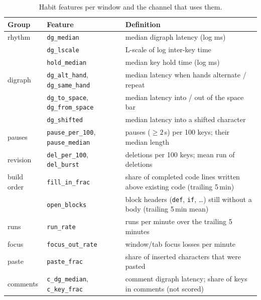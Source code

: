 \begin{table}[ht]
  \centering\small
  \caption{Habit features per window and the channel that uses them.}
  \label{tab:features}
  \begin{tabularx}{\linewidth}{@{}llX@{}}
    \toprule
    Group & Feature & Definition \\
    \midrule
    rhythm & \texttt{dg\_median} & median digraph latency (log ms) \\
     & \texttt{dg\_lscale} & L-scale of log inter-key time \\
     & \texttt{hold\_median} & median key hold time (log ms) \\
    digraph & \texttt{dg\_alt\_hand}, \texttt{dg\_same\_hand} & median latency when hands alternate / repeat \\
     & \texttt{dg\_to\_space}, \texttt{dg\_from\_space} & median latency into / out of the space bar \\
     & \texttt{dg\_shifted} & median latency into a shifted character \\
    \midrule
    pauses & \texttt{pause\_per\_100}, \texttt{pause\_median} & pauses ($\ge 2$\,s) per 100 keys; their median length \\
    revision & \texttt{del\_per\_100}, \texttt{del\_burst} & deletions per 100 keys; mean run of deletions \\
    build order & \texttt{fill\_in\_frac} & share of completed code lines written above existing code (trailing 5\,min) \\
     & \texttt{open\_blocks} & block headers (\texttt{def}, \texttt{if}, \ldots) still without a body (trailing 5\,min mean) \\
    runs & \texttt{run\_rate} & runs per minute over the trailing 5 minutes \\
    focus & \texttt{focus\_out\_rate} & window/tab focus losses per minute \\
    paste & \texttt{paste\_frac} & share of inserted characters that were pasted \\
    \midrule
    comments & \texttt{c\_dg\_median}, \texttt{c\_key\_frac} & comment digraph latency; share of keys in comments (not scored) \\
    \bottomrule
  \end{tabularx}
\end{table}

